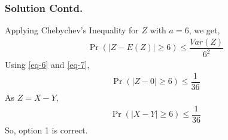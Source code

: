\documentclass{beamer}
\providecommand{\pr}[1]{\ensuremath{\Pr\left(#1\right)}}
\begin{document}
\begin{frame}
\frametitle{Solution Contd.}
Applying Chebychev's Inequality for $Z$ with $a=6$, we get,
\begin{align}
    \pr{|Z-E(Z)| \geq 6} \leq \dfrac{Var(Z)}{6^2}
\end{align}
Using \eqref{eq-6} and \eqref{eq-7},
\begin{align}
    \pr{|Z-0| \geq 6} \leq \dfrac{1}{36}
\end{align}
As $Z=X-Y$,
\begin{align}
    \pr{|X-Y| \geq 6} \leq \dfrac{1}{36}
\end{align}
So, option 1 is correct.
\end{frame}
\end{document}
